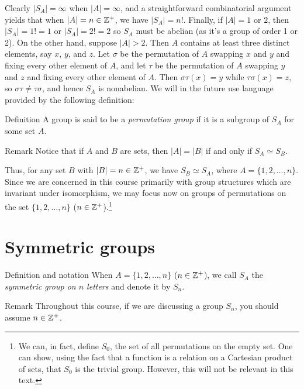 Clearly $|S_A|=\infty$ when $|A|=\infty$, and a straightforward
combinatorial argument yields that when $|A|=n \in \mathbb{Z}^+$, we have
$|S_A|=n!$. Finally, if $|A|=1$ or $2$, then $|S_A|=1!=1$ or
$|S_A|=2!=2$ so $S_A$ must be abelian (as it's a group of order 1 or
2). On the other hand, suppose $|A|>2$. Then $A$ contains at least
three distinct elements, say $x$, $y$, and $z$. Let $\sigma$ be the
permutation of $A$ swapping $x$ and $y$ and fixing every other
element of $A$, and let $\tau$ be the permutation of $A$ swapping
$y$ and $z$ and fixing every other element of $A$.  Then $\sigma
\tau(x)=y$ while $\tau \sigma(x)=z$, so $\sigma \tau \neq \tau
\sigma$, and hence $S_A$ is nonabelian.
 We will in the future use language provided by the following
definition:

\begin{df}{Definition} A group is said to be a \textit{permutation group} if it is
a subgroup of $S_A$ for some set $A$.\end{df}

\begin{df}{Remark} Notice
that if $A$ and $B$ are sets, then $|A|=|B|$ if and only if
$S_A\simeq S_B$.\end{df}

 Thus, for any set $B$ with $|B|=n \in \mathbb{Z}^+$, we have $S_B\simeq
S_A$, where $A=\{1,2,\ldots,n\}$. Since we are concerned in this
course primarily with group structures which are invariant under
isomorphism, we may focus now on groups of permutations on the set
$\{1,2,\ldots, n\}$ ($n\in \mathbb{Z}^+$).\footnote{We can, in fact,  define $S_0$, the set of all permutations on the empty set. One can show, using the fact that a function is a relation on a Cartesian product of sets, that $S_0$ is the trivial group. However, this will not be relevant in this text.}

\section{Symmetric groups}

\begin{df}{Definition and notation} When $A=\{1,2,\ldots, n\}$ ($n\in \mathbb{Z}^+$), we call $S_A$
the \textit{symmetric group on $n$ letters} and denote it by
$S_n$.\end{df}

\begin{df}{Remark} Throughout this course, if we are discussing a
group $S_n$, you should assume $n\in \mathbb{Z}^+$.\end{df}


